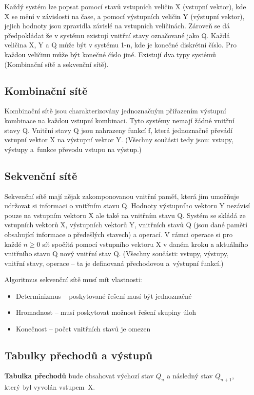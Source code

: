 Každý systém lze popsat pomocí stavů vstupních veličin X (vstupní vektor), kde X se mění v závislosti na čase, a pomocí výstupních veličin Y (výstupní vektor), jejich hodnoty jsou zpravidla závislé na vstupních veličinách.
Zároveň se dá předpokládat že v systému existují vnitřní stavy označované jako Q.
Každá veličina X, Y a Q může být v systému 1-n, kde je konečné diskrétní číslo.
Pro každou veličinu může být konečné číslo jiné.
Existují dva typy systémů (Kombinační sítě a sekvenční sítě).

\subsection{Kombinační sítě}

Kombinační sítě jsou charakterizovány jednoznačným přiřazením výstupní kombinace na každou vstupní kombinaci.
Tyto systémy nemají žádné vnitřní stavy Q.
Vnitřní stavy Q jsou nahrazeny funkcí f, která jednoznačně převádí vstupní vektor X na výstupní vektor Y. (Všechny součásti tedy jsou: vstupy, výstupy a~funkce převodu vstupu na výstup.)

\subsection{Sekvenční sítě}

Sekvenční sítě mají nějak zakomponovanou vnitřní paměť, která jim umožňuje udržovat si informaci o vnitřním stavu Q.
Hodnoty výstupního vektoru Y nezávisí pouze na vstupním vektoru X ale také na vnitřním stavu Q.
Systém se skládá ze vstupních vektorů X, výstupních vektorů Y, vnitřních stavů Q (jsou dané pamětí obsahující informace o předešlých stavech) a operací.
V rámci operace si pro každé $n\ge0$ síť spočítá pomocí vstupního vektoru X v daném kroku a aktuálního vnitřního stavu Q nový vnitřní stav Q. (Všechny součásti: vstupy, výstupy, vnitřní stavy, operace -- ta je definovaná přechodovou a~výstupní funkcí.) 

Algoritmus sekvenční sítě musí mít vlastnosti:
\begin{itemize}[noitemsep]
    \item Determinizmus -- poskytované řešení musí být jednoznačné
    \item Hromadnost -- musí poskytovat možnost řešení skupiny úloh
    \item Konečnost -- počet vnitřních stavů je omezen
\end{itemize}

\subsection{Tabulky přechodů a výstupů}
\textbf{Tabulka přechodů} bude obsahovat výchozí stav $Q_n$ a následný stav $Q_{n+1}$, který byl vyvolán vstupem~X.

